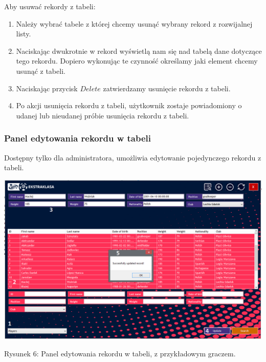 \documentclass[12pt,a4paper]{article}
\begin{document}
    Aby usuwać rekordy z tabeli:
    \begin{enumerate}
        \item Należy wybrać tabele z której chcemy usunąć wybrany rekord z rozwijalnej listy.
        \item Naciskając dwukrotnie w rekord wyświetlą nam się nad tabelą dane dotyczące tego rekordu. Dopiero wykonując te czynność określamy jaki element chcemy usunąć z tabeli.
        \item Naciskając przycisk $Delete$ zatwierdzamy usunięcie rekordu z tabeli.
        \item Po akcji usunięcia rekordu z tabeli, użytkownik zostaje powiadomiony o udanej lub nieudanej próbie usunięcia rekordu z tabeli.
    \end{enumerate}

    \newpage

    \subsubsection{Panel edytowania rekordu w tabeli}
    Dostępny tylko dla administratora, umożliwia edytowanie pojedynczego rekordu z tabeli.
    \begin{center}
        \includegraphics[scale=0.47]{update-panel.png}
        \begin{flushleft}
            \begin{scriptsize}
            \begin{list}{}{\leftmargin=13.5em}\raggedright\item\relax
            Rysunek 6: Panel edytowania rekordu w tabeli, z przykładowym graczem.
            \end{list}
            \end{scriptsize}
        \end{flushleft}
    \end{center}
\end{document}
